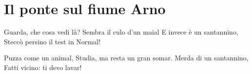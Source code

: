 \section{Il ponte sul fiume Arno}
\subtitle{Su “Colonel Bogey March” dal film “Il ponte sul fiume Kwai”}
\begin{canzone}
Guarda, che cosa vedi là?
Sembra il culo d’un maial
E invece è un santannino,
Steccò persino il test in Normal!

Puzza come un animal,
Studia, ma resta un gran somar.
Merda di un santannino,
Fatti vicino: ti devo lavar!

\end{canzone}
